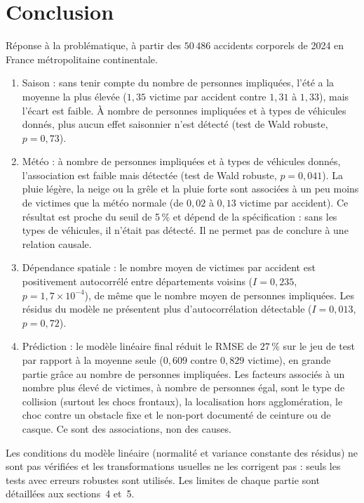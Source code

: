 \documentclass[11pt,a4paper]{article}
\begin{document}
\section{Conclusion}

Réponse à la problématique, à partir des $50\,486$ accidents corporels de 2024 en France métropolitaine continentale.
\begin{enumerate}
    \item Saison : sans tenir compte du nombre de personnes impliquées, l'été a la moyenne la plus élevée ($1{,}35$ victime par accident contre $1{,}31$ à $1{,}33$), mais l'écart est faible. À nombre de personnes impliquées et à types de véhicules donnés, plus aucun effet saisonnier n'est détecté (test de Wald robuste, $p = 0{,}73$).
    \item Météo : à nombre de personnes impliquées et à types de véhicules donnés, l'association est faible mais détectée (test de Wald robuste, $p = 0{,}041$). La pluie légère, la neige ou la grêle et la pluie forte sont associées à un peu moins de victimes que la météo normale (de $0{,}02$ à $0{,}13$ victime par accident). Ce résultat est proche du seuil de 5\,\% et dépend de la spécification : sans les types de véhicules, il n'était pas détecté. Il ne permet pas de conclure à une relation causale.
    \item Dépendance spatiale : le nombre moyen de victimes par accident est positivement autocorrélé entre départements voisins ($I = 0{,}235$, $p = 1{,}7\times10^{-4}$), de même que le nombre moyen de personnes impliquées. Les résidus du modèle ne présentent plus d'autocorrélation détectable ($I = 0{,}013$, $p = 0{,}72$).
    \item Prédiction : le modèle linéaire final réduit le RMSE de $27\,\%$ sur le jeu de test par rapport à la moyenne seule ($0{,}609$ contre $0{,}829$ victime), en grande partie grâce au nombre de personnes impliquées. Les facteurs associés à un nombre plus élevé de victimes, à nombre de personnes égal, sont le type de collision (surtout les chocs frontaux), la localisation hors agglomération, le choc contre un obstacle fixe et le non-port documenté de ceinture ou de casque. Ce sont des associations, non des causes.
\end{enumerate}

Les conditions du modèle linéaire (normalité et variance constante des résidus) ne sont pas vérifiées et les transformations usuelles ne les corrigent pas : seuls les tests avec erreurs robustes sont utilisés. Les limites de chaque partie sont détaillées aux sections~4 et~5.

\end{document}
